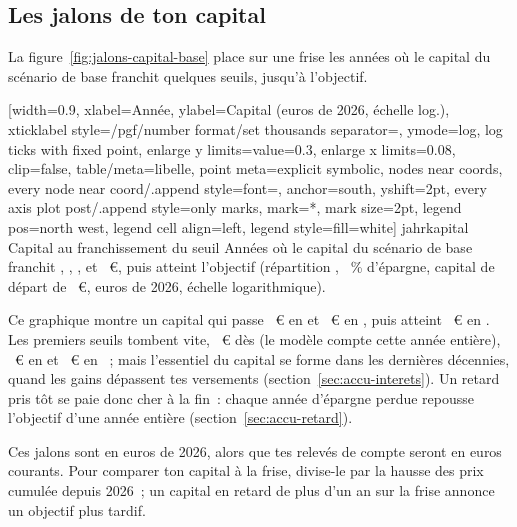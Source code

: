 \subsection{Les jalons de ton capital}\label{sec:plan-jalons}

La figure~\ref{fig:jalons-capital-base} place sur une frise les ann\'ees o\`u le capital du sc\'enario
de base franchit quelques seuils, jusqu'\`a l'objectif.

[width=0.9\linewidth, xlabel={Ann\'ee}, ylabel={Capital (euros de 2026, \'echelle log.)},
  xticklabel style={/pgf/number format/set thousands separator={}}, ymode=log,
  log ticks with fixed point, enlarge y limits={value=0.3}, enlarge x limits=0.08, clip=false,
  table/meta=libelle, point meta=explicit symbolic, nodes near coords,
  every node near coord/.append style={font=\scriptsize, anchor=south, yshift=2pt},
  every axis plot post/.append style={only marks, mark=*, mark size=2pt},
  legend pos=north west, legend cell align=left, legend style={fill=white}]%
  {jahr}{kapital}%
  {{Capital au franchissement du seuil}}%
  {Ann\'ees o\`u le capital du sc\'enario de base franchit \JalonSeuilDixMille, \JalonSeuilCinquanteMille,
  \JalonSeuilCentMille, \JalonSeuilDeuxCentCinquanteMille{} et \JalonSeuilCinqCentMille~€, puis atteint
  l'objectif (r\'epartition \ReferenzStrategie, \ReferenzSparquote~\% d'\'epargne, capital de d\'epart de
  \KapitalDepartMitte~€, euros de 2026, \'echelle logarithmique).\label{fig:jalons-capital-base}}

Ce graphique montre un capital qui passe \JalonSeuilCentMille~€ en \JalonAnneeCentMille{} et
\JalonSeuilCinqCentMille~€ en \JalonAnneeCinqCentMille, puis atteint \KapitalYannBasis~€ en
\AnneeYannBasis. Les premiers seuils tombent vite, \JalonSeuilDixMille~€ d\`es \JalonAnneeDixMille{}
(le mod\`ele compte cette ann\'ee enti\`ere), \JalonSeuilCinquanteMille~€ en
\JalonAnneeCinquanteMille{} et \JalonSeuilDeuxCentCinquanteMille~€ en
\JalonAnneeDeuxCentCinquanteMille~; mais l'essentiel du capital se forme dans les derni\`eres
d\'ecennies, quand les gains d\'epassent tes versements (section~\ref{sec:accu-interets}). Un retard
pris t\^ot se paie donc cher \`a la fin~: chaque ann\'ee d'\'epargne perdue repousse l'objectif d'une
ann\'ee enti\`ere (section~\ref{sec:accu-retard}).

Ces jalons sont en euros de 2026, alors que tes relev\'es de compte seront en euros courants. Pour
comparer ton capital \`a la frise, divise-le par la hausse des prix cumul\'ee depuis 2026~; un capital
en retard de plus d'un an sur la frise annonce un objectif plus tardif.

